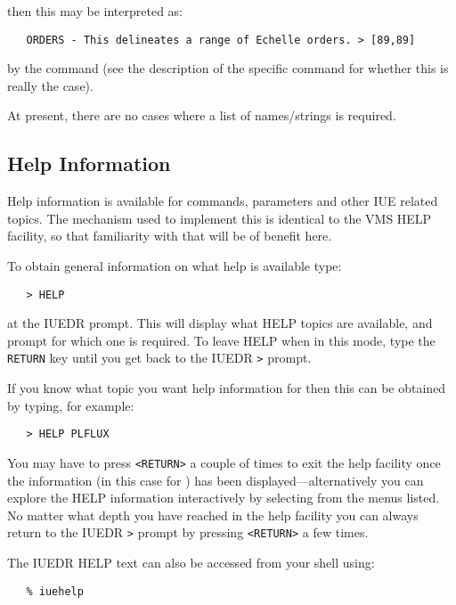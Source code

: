 then this may be interpreted as:

\begin{verbatim}
   ORDERS - This delineates a range of Echelle orders. > [89,89]
\end{verbatim}

by the command (see the description of the specific command for whether
this is really the case)\@.

At present, there are no cases where a list of names/strings is required.


\subsection{Help Information}

Help information is available for commands, parameters and other IUE related
topics.  The mechanism used to implement this is identical to the VMS HELP
facility, so that familiarity with that will be of benefit here.

To obtain general information on what help is available type:

\begin{verbatim}
   > HELP
\end{verbatim}

at the IUEDR prompt.
This will display what HELP topics are available, and prompt for which one is
required.  To leave HELP when in this mode, type the \verb+RETURN+ key until
you get back to the IUEDR \verb+>+ prompt.

If you know what topic you want help information for then this can be
obtained by typing, for example:

\begin{verbatim}
   > HELP PLFLUX
\end{verbatim}

You may have to press \verb+<RETURN>+ a couple of times to exit the help
facility once the information (in this case for
) has been
displayed---alternatively you can explore the HELP information interactively
by selecting from the menus listed.  No matter what depth you have reached in
the help facility you can always return to the IUEDR \verb+>+ prompt by
pressing \verb+<RETURN>+ a few times.

The IUEDR HELP text can also be accessed from your shell using:

\begin{verbatim}
   % iuehelp
\end{verbatim}

